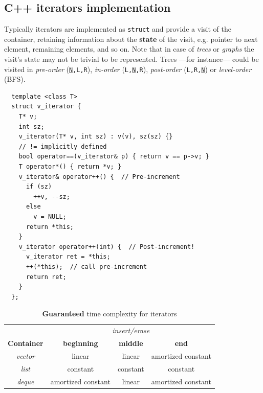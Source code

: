 \subsection{C++ iterators implementation}
Typically iterators are implemented as \lstinline|struct| and provide a visit of the container,
retaining information about the \textbf{state} of the visit, e.g. pointer to next element, remaining elements, and so on.
Note that in case of \textit{trees} or \textit{graphs} the visit's state may not be trivial to be represented.
Trees ---for instance--- could be visited in \textit{pre-order} (\texttt{\ul{N},L,R}), \textit{in-order} (\texttt{L,\ul{N},R}), \textit{post-order} (\texttt{L,R,\ul{N}}) or \textit{level-order} (BFS).
\begin{lstlisting}
  template <class T>
  struct v_iterator {
    T* v;
    int sz;
    v_iterator(T* v, int sz) : v(v), sz(sz) {}
    // != implicitly defined
    bool operator==(v_iterator& p) { return v == p->v; }
    T operator*() { return *v; }
    v_iterator& operator++() {  // Pre-increment
      if (sz)
        ++v, --sz;
      else
        v = NULL;
      return *this;
    }
    v_iterator operator++(int) {  // Post-increment!
      v_iterator ret = *this;
      ++(*this);  // call pre-increment
      return ret;
    }
  };
\end{lstlisting}

\setlength{\heavyrulewidth}{1.5pt}
\setlength{\abovetopsep}{4pt}
\begin{table}[!htbp]
  \centering
  \begin{tabular}{c|c|c|c}
    \toprule
    & \multicolumn{3}{c}{\textit{insert/erase}}\\
    \textbf{Container} & \textbf{beginning} & \textbf{middle} & \textbf{end} \\
    \midrule
    \textit{vector}  & linear              & linear    & amortized constant\\
    \textit{list}    & constant            & constant  & constant\\
    \textit{deque}   & amortized constant  & linear    & amortized constant\\
    \hline
  \end{tabular}
  \caption{\textbf{Guaranteed} time complexity for iterators}
\end{table}

